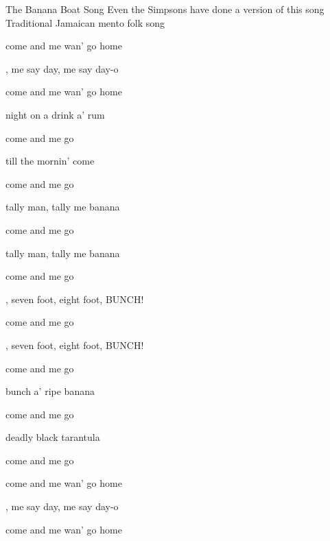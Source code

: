 \begin{SBSong}{The Banana Boat Song}
  {Even the Simpsons have done a version of this song}
  {Traditional Jamaican mento folk song}
  \begin{SBVerse}

     come and me wan' go home
    
    , me say day, me say day-o

     come and me wan' go home
  \end{SBVerse}
  \begin{SBVerse}
     night on a drink a' rum

     come and me  go 
    
     till the mornin' come

     come and me  go 
  \end{SBVerse}
  \WBPageBrk
  \begin{SBVerse}
     tally man, tally me banana

     come and me  go 
    
     tally man, tally me banana

     come and me  go 
  \end{SBVerse}
  \begin{SBVerse}
    , seven foot, eight foot, BUNCH!

     come and me  go 
    
    , seven foot, eight foot, BUNCH!

     come and me  go 
  \end{SBVerse}
  \begin{SBVerse} 
     bunch a' ripe banana

     come and me  go 

     deadly black tarantula

     come and me  go 
  \end{SBVerse}
  \begin{SBVerse}

     come and me wan' go home
    
    , me say day, me say day-o

     come and me wan' go home
  \end{SBVerse}
\end{SBSong}
  
